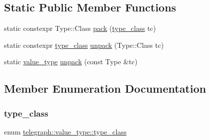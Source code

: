 \subsection*{Static Public Member Functions}
\begin{DoxyCompactItemize}
\item 
static constexpr Type\+::\+Class \hyperlink{classtelegraph_1_1value__type_a7d002f4e90bf6e8dc7e1527a9cb4d894}{pack} (\hyperlink{classtelegraph_1_1value__type_a516081c0a4e231cb22554f48f052ff6f}{type\+\_\+class} tc)
\item 
static constexpr \hyperlink{classtelegraph_1_1value__type_a516081c0a4e231cb22554f48f052ff6f}{type\+\_\+class} \hyperlink{classtelegraph_1_1value__type_abf022119eeb1ba37cfe259550830a04d}{unpack} (Type\+::\+Class tc)
\item 
static \hyperlink{classtelegraph_1_1value__type}{value\+\_\+type} \hyperlink{classtelegraph_1_1value__type_a3a4a3de4847ee82da57b5926b534df1f}{unpack} (const Type \&tc)
\end{DoxyCompactItemize}


\subsection{Member Enumeration Documentation}
\mbox{\label{classtelegraph_1_1value__type_a516081c0a4e231cb22554f48f052ff6f}} 
\subsubsection{\texorpdfstring{type\+\_\+class}{type\_class}}
{\footnotesize\ttfamily enum \hyperlink{classtelegraph_1_1value__type_a516081c0a4e231cb22554f48f052ff6f}{telegraph\+::value\+\_\+type\+::type\+\_\+class}}

